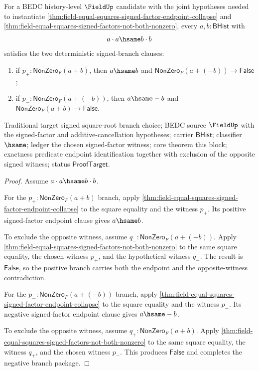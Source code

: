 \begin{theorem}
\label{thm:field-equal-squares-signed-branch-determinacy}
For a BEDC history-level $\FieldUp$ candidate with the joint hypotheses needed
to instantiate
\autoref{thm:field-equal-squares-signed-factor-endpoint-collapse} and
\autoref{thm:field-equal-squares-signed-factors-not-both-nonzero}, every
$a,b:\mathsf{BHist}$ with
$$
a\cdot a\hsame b\cdot b
$$
satisfies the two deterministic signed-branch clauses:
\begin{enumerate}
\item if $p_+:\mathsf{NonZero}_F(a+b)$, then $a\hsame b$ and
$\mathsf{NonZero}_F(a+(-b))\to\mathsf{False}$;
\item if $p_-:\mathsf{NonZero}_F(a+(-b))$, then $a\hsame -b$ and
$\mathsf{NonZero}_F(a+b)\to\mathsf{False}$.
\end{enumerate}
Traditional target signed square-root branch choice; BEDC source $\FieldUp$
with the signed-factor and additive-cancellation hypotheses; carrier
$\mathsf{BHist}$; classifier $\hsame$; ledger the chosen signed-factor witness;
core theorem this block; exactness predicate endpoint identification together
with exclusion of the opposite signed witness; status $\mathsf{ProofTarget}$.
\end{theorem}
\begin{proof}
Assume $a\cdot a\hsame b\cdot b$.

For the $p_+:\mathsf{NonZero}_F(a+b)$ branch, apply
\autoref{thm:field-equal-squares-signed-factor-endpoint-collapse} to the square
equality and the witness $p_+$. Its positive signed-factor endpoint clause
gives $a\hsame b$.

To exclude the opposite witness, assume
$q_-:\mathsf{NonZero}_F(a+(-b))$. Apply
\autoref{thm:field-equal-squares-signed-factors-not-both-nonzero} to the same
square equality, the chosen witness $p_+$, and the hypothetical witness $q_-$.
The result is $\mathsf{False}$, so the positive branch carries both the endpoint
and the opposite-witness contradiction.

For the $p_-:\mathsf{NonZero}_F(a+(-b))$ branch, apply
\autoref{thm:field-equal-squares-signed-factor-endpoint-collapse} to the square
equality and the witness $p_-$. Its negative signed-factor endpoint clause
gives $a\hsame -b$.

To exclude the opposite witness, assume $q_+:\mathsf{NonZero}_F(a+b)$. Apply
\autoref{thm:field-equal-squares-signed-factors-not-both-nonzero} to the same
square equality, the witness $q_+$, and the chosen witness $p_-$. This produces
$\mathsf{False}$ and completes the negative branch package.
\end{proof}

